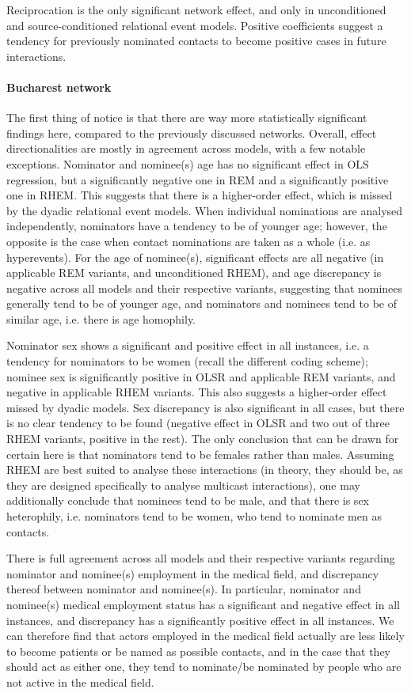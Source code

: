 Reciprocation is the only significant network effect, and only in unconditioned and source-conditioned relational event models. Positive coefficients suggest a tendency for previously nominated contacts to become positive cases in future interactions.

\paragraph{Bucharest network} The first thing of notice is that there are way more statistically significant findings here, compared to the previously discussed networks. Overall, effect directionalities are mostly in agreement across models, with a few notable exceptions. Nominator and nominee(s) age has no significant effect in OLS regression, but a significantly negative one in REM and a significantly positive one in RHEM. This suggests that there is a higher-order effect, which is missed by the dyadic relational event models. When individual nominations are analysed independently, nominators have a tendency to be of younger age; however, the opposite is the case when contact nominations are taken as a whole (i.e. as hyperevents). For the age of nominee(s), significant effects are all negative (in applicable REM variants, and unconditioned RHEM), and age discrepancy is negative across all models and their respective variants, suggesting that nominees generally tend to be of younger age, and nominators and nominees tend to be of similar age, i.e. there is age homophily. 

Nominator sex shows a significant and positive effect in all instances, i.e. a tendency for nominators to be women (recall the different coding scheme); nominee sex is significantly positive in OLSR and applicable REM variants, and negative in applicable RHEM variants. This also suggests a higher-order effect missed by dyadic models. Sex discrepancy is also significant in all cases, but there is no clear tendency to be found (negative effect in OLSR and two out of three RHEM variants, positive in the rest). The only conclusion that can be drawn for certain here is that nominators tend to be females rather than males. Assuming RHEM are best suited to analyse these interactions (in theory, they should be, as they are designed specifically to analyse multicast interactions), one may additionally conclude that nominees tend to be male, and that there is sex heterophily, i.e. nominators tend to be women, who tend to nominate men as contacts.

There is full agreement across all models and their respective variants regarding nominator and nominee(s) employment in the medical field, and discrepancy thereof between nominator and nominee(s). In particular, nominator and nominee(s) medical employment status has a significant and negative effect in all instances, and discrepancy has a significantly positive effect in all instances. We can therefore find that actors employed in the medical field actually are less likely to become patients or be named as possible contacts, and in the case that they should act as either one, they tend to nominate/be nominated by people who are not active in the medical field.

